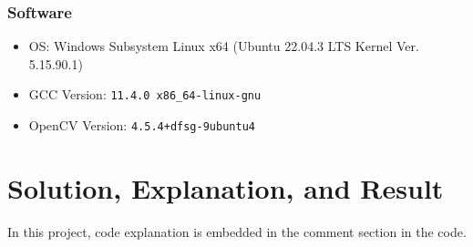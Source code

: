 \documentclass[12pt,a4paper]{report}
\begin{document}
\subsection{Software}
\begin{itemize}
  \item OS\@: Windows Subsystem Linux x64 (Ubuntu 22.04.3 LTS Kernel Ver. 5.15.90.1)
  \item GCC Version\@: \verb|11.4.0 x86_64-linux-gnu|
  \item OpenCV Version\@: \verb|4.5.4+dfsg-9ubuntu4|
\end{itemize}

\chapter{Solution, Explanation, and Result}
In this project, code explanation is embedded in the comment section in the code.
\end{document}
